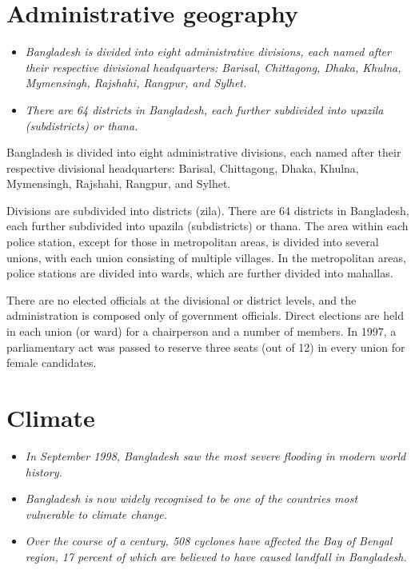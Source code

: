\section{Administrative geography}\label{administrative-geography}

\begin{itemize}
\item
  \emph{Bangladesh is divided into eight administrative divisions, each
  named after their respective divisional headquarters: Barisal,
  Chittagong, Dhaka, Khulna, Mymensingh, Rajshahi, Rangpur, and Sylhet.}
\item
  \emph{There are 64 districts in Bangladesh, each further subdivided
  into upazila (subdistricts) or thana.}
\end{itemize}

Bangladesh is divided into eight administrative divisions, each named
after their respective divisional headquarters: Barisal, Chittagong,
Dhaka, Khulna, Mymensingh, Rajshahi, Rangpur, and Sylhet.

Divisions are subdivided into districts (zila). There are 64 districts
in Bangladesh, each further subdivided into upazila (subdistricts) or
thana. The area within each police station, except for those in
metropolitan areas, is divided into several unions, with each union
consisting of multiple villages. In the metropolitan areas, police
stations are divided into wards, which are further divided into
mahallas.

There are no elected officials at the divisional or district levels, and
the administration is composed only of government officials. Direct
elections are held in each union (or ward) for a chairperson and a
number of members. In 1997, a parliamentary act was passed to reserve
three seats (out of 12) in every union for female candidates.

\section{Climate}\label{climate}

\begin{itemize}
\item
  \emph{In September 1998, Bangladesh saw the most severe flooding in
  modern world history.}
\item
  \emph{Bangladesh is now widely recognised to be one of the countries
  most vulnerable to climate change.}
\item
  \emph{Over the course of a century, 508 cyclones have affected the Bay
  of Bengal region, 17 percent of which are believed to have caused
  landfall in Bangladesh.}
\end{itemize}

